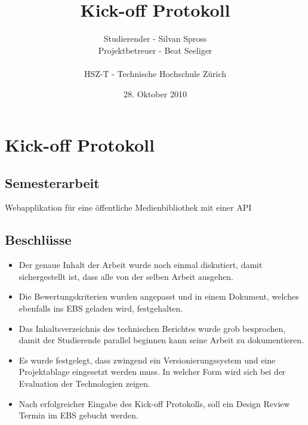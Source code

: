 \documentclass[]{scrreprt}
\title{Kick-off Protokoll}
\author{Studierender - Silvan Spross\\
    Projektbetreuer - Beat Seeliger\\
    \\
    HSZ-T - Technische Hochschule Zürich}
\date{28. Oktober 2010}
\begin{document}
    \ifpdf
    \else
    \fi

    \maketitle



    \chapter{Kick-off Protokoll}

    \section{Semesterarbeit}
    Webapplikation für eine öffentliche Medienbibliothek mit einer 
    API

    \section{Beschlüsse}
    \begin{itemize}
        \item Der genaue Inhalt der Arbeit wurde noch einmal diskutiert,
        damit sichergestellt ist, dass alle von der selben Arbeit ausgehen.
        \item Die Bewertungskriterien wurden angepasst und in einem Dokument,
        welches ebenfalls ins EBS geladen wird, festgehalten.
        \item Das Inhaltsverzeichnis des technischen Berichtes wurde grob
        besprochen, damit der Studierende parallel beginnen kann seine Arbeit
        zu dokumentieren.
        \item Es wurde festgelegt, dass zwingend ein Versionierungssystem
        und eine Projektablage eingesetzt werden muss. In welcher Form wird
        sich bei der Evaluation der Technologien zeigen.
        \item Nach erfolgreicher Eingabe des Kick-off Protokolls, soll ein
        Design Review Termin im EBS gebucht werden.
    \end{itemize}
    
\end{document}
